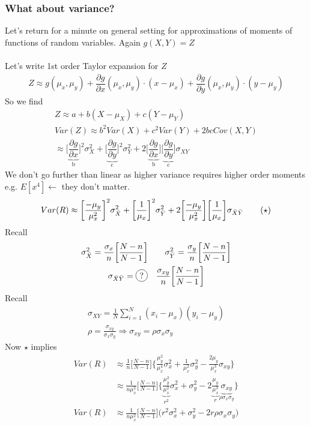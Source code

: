 \subsubsection*{What about variance?}
Let's return for a minute on general setting for approximations of moments of functions of random variables. Again $g(X,Y) = Z$\\\\
Let's write 1st order Taylor expansion for $Z$
\begin{gather*}
	Z \approx g(\mu_x, \mu_y) + \dfrac{\partial g}{\partial x}(\mu_x, \mu_y) \cdot (x - \mu_x) + \dfrac{\partial g}{\partial y}(\mu_x, \mu_y) \cdot (y - \mu_y)
\end{gather*}
So we find 
\begin{gather*}
	Z \approx a + b(X - \mu_X) + c(Y - \mu_Y)\\
	Var(Z) \approx b^2Var(X) + c^2 Var(Y) + 2bcCov(X,Y)\\
	\approx \bigg[\underbrace{\dfrac{\partial g}{\partial x}}_{\text{b}} \bigg]^2 \sigma_X^2 + \bigg[\underbrace{\dfrac{\partial g}{\partial y}}_{\text{c}} \bigg]^2 \sigma_Y^2 + 2 \bigg[\underbrace{\dfrac{\partial g}{\partial x}}_{\text{b}} \bigg] \bigg[\underbrace{\dfrac{\partial g}{\partial y}}_{\text{c}} \bigg] \sigma_{XY} 
\end{gather*}
We don't go further than linear as higher variance requires higher order moments e.g. $E[x^4] \leftarrow$ they don't matter.
\begin{gather*}
	Var(R) \approx \bigg[\dfrac{-\mu_y}{\mu_x^2} \bigg]^2 \sigma_{\bar{X}}^2 + \bigg[ \frac{1}{\mu_x} \bigg]^2 \sigma_{\bar{Y}}^2 + 2 \bigg[\dfrac{-\mu_y}{\mu_x^2} \bigg] \bigg[\frac{1}{\mu_x} \bigg] \sigma_{\bar{X} \bar{Y}} \tag{$\star$}
\end{gather*}
Recall
\begin{gather*}
	\sigma_{\bX}^2 = \frac{\sigma_x}{n} \bigg[\frac{N-n}{N-1} \bigg] \qquad \sigma_{\bar{Y}}^2 = \frac{\sigma_y}{n} \bigg[\frac{N-n}{N-1} \bigg]\\
	\sigma_{\bX \bar{Y}} = \circled{?} \quad \frac{\sigma_{xy}}{n} \bigg[\frac{N-n}{N-1} \bigg]
\end{gather*}
Recall
\begin{gather*}
	\sigma_{XY} = \frac{1}{N} \sum_{i=1}^N (x_i - \mu_x)(y_i - \mu_y)\\
	\rho = \frac{\sigma_{xy}}{\sigma_x \sigma_y} \Longrightarrow \boxed{\sigma_{xy} = \rho \sigma_x \sigma_y}
\end{gather*}
Now $\star$ implies
\begin{align*}
	Var(R) & \approx \frac{1}{n} \bigg[\frac{N-n}{N-1}\bigg] \bigg\{ \frac{\mu_y^2}{\mu_x^4} \sigma_x^2 + \frac{1}{\mu_x^2} \sigma_y^2 - \frac{2\mu_y}{\mu_x^3} \sigma_{xy} \bigg\}\\
	& \approx \frac{1}{n\mu_x^2} \bigg[\frac{N-n}{N-1}\bigg] \bigg\{ \underbrace{\frac{\mu_y^2}{\mu_x^2}}_{r^2} \sigma_x^2 + \sigma_y^2 - 2\underbrace{\frac{\mu_y}{\mu_x^3}}_{r} \underbrace{\sigma_{xy}}_{\rho \sigma_x \sigma_y} \bigg\}\\
	Var(R) & \approx \frac{1}{n\mu_x^2} \bigg[\frac{N-n}{N-1}\bigg] \big( r^2\sigma_x^2 + \sigma_y^2 - 2r\rho \sigma_x \sigma_y \big)
\end{align*}
\redhline
